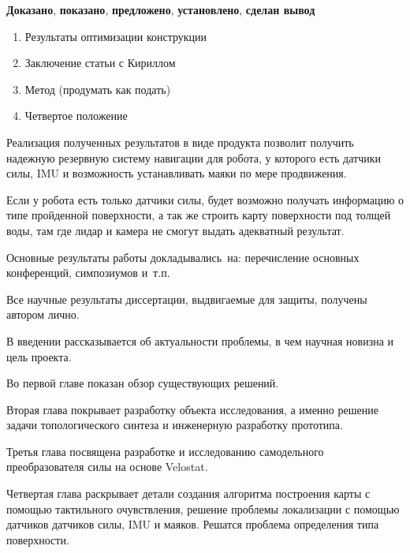 {\novelty}
\textbf{Доказано}, \textbf{показано}, \textbf{предложено}, \textbf{установлено}, \textbf{сделан вывод}


{}
\begin{enumerate}[beginpenalty=10000] %
  \item Результаты оптимизации конструкции
  \item Заключение статьи с Кириллом
  \item Метод (продумать как подать)
  \item Четвертое положение
\end{enumerate}


{\influence} Реализация полученных результатов в виде продукта позволит получить надежную резервную систему навигации для робота, у которого есть датчики силы, IMU и возможность устанавливать маяки по мере продвижения.

Если у робота есть только датчики силы, будет возможно получать информацию о типе пройденной поверхности, а так же строить карту поверхности под толщей воды, там где лидар и камера не смогут выдать адекватный результат.


{\probation}
Основные результаты работы докладывались~на:
перечисление основных конференций, симпозиумов и~т.\:п.

{\contribution} Все научные результаты диссертации, выдвигаемые для защиты, получены автором лично.



{\struct}
В введении рассказывается об актуальности проблемы, в чем научная новизна и цель проекта.

Во первой главе показан обзор существующих решений.

Вторая глава покрывает разработку объекта исследования, а именно решение задачи топологического синтеза и инженерную разработку прототипа.

Третья глава посвящена разработке и исследованию самодельного преобразователя силы на основе Velostat.

Четвертая глава раскрывает детали создания алгоритма построения карты с помощью тактильного очувствления, решение проблемы локализации с помощью датчиков датчиков силы, IMU и маяков. Решатся проблема определения типа поверхности.